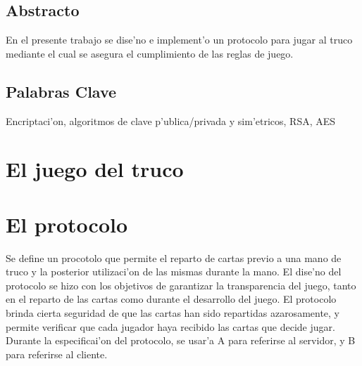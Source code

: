 \documentclass[spanish, a4paper, 11pt]{article}
\begin{document}
\maketitle

\subsection*{Abstracto}
En el presente trabajo se dise'no e implement'o un protocolo para jugar al truco mediante el cual se asegura el cumplimiento de las reglas de juego.


\subsection*{Palabras Clave}
Encriptaci'on, algoritmos de clave p'ublica/privada y sim'etricos, RSA, AES


\clearpage
\tableofcontents

\clearpage


\clearpage
\section{El juego del truco}





\clearpage
\section{El protocolo}
Se define un procotolo que permite el reparto de cartas previo a una mano de truco y la posterior utilizaci'on de las mismas durante la mano. El dise'no del protocolo se hizo con los objetivos de garantizar la transparencia del juego, tanto en el reparto de las cartas como durante el desarrollo del juego.
El protocolo brinda cierta seguridad de que las cartas han sido repartidas azarosamente, y permite verificar que cada jugador haya recibido las cartas que decide jugar.
Durante la especificai'on del protocolo, se usar'a A para referirse al servidor, y B para referirse al cliente.


\end{document}
